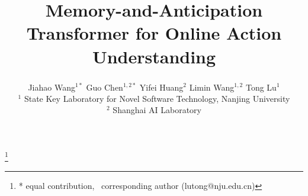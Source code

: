 \documentclass[10pt,twocolumn,letterpaper]{article}
\newcommand\blfootnote[1]{%
	\begingroup
	\renewcommand\thefootnote{}\footnote{#1}%
	\addtocounter{footnote}{-1}%
	\endgroup
}
\begin{document}
\title{
Memory-and-Anticipation Transformer for Online Action Understanding
}

\author{
    Jiahao Wang$^{1*}$ \quad
    Guo Chen$^{1, 2*}$ \quad
    Yifei Huang$^{2}$ \quad
    Limin Wang$^{1, 2}$ \quad
    Tong Lu$^{1}$\textsuperscript{\Letter} \\
    $^1$ State Key Laboratory for Novel Software Technology, Nanjing University \\
    $^2$ Shanghai AI Laboratory \\
}

\maketitle
\thispagestyle{empty}
\blfootnote{* equal contribution, \Letter\ corresponding author (lutong@nju.edu.cn)}








 

{\small


}
% 
\end{document}

